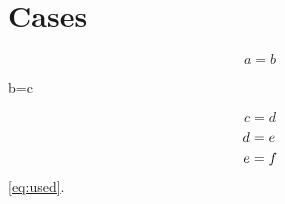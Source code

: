 \documentclass{normal}
\begin{document}
\section{Cases}
\begin{equation}\label{eq:plain}a=b\end{equation}
\begin{equation+}\label{eq:forced}b=c\end{equation+}
\begin{equation}\tag{custom}\label{eq:tagged}c=d\end{equation}
\begin{align}
  d&=e\notag\\
  e&=f\label{eq:used}
\end{align}
\cref{eq:used}.
\end{document}
